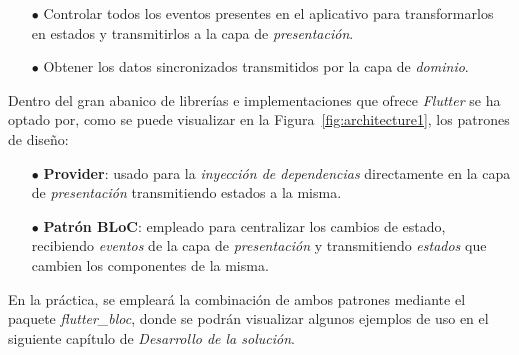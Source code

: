 \begin{itemize}
  \item[$\bullet$] Controlar todos los eventos presentes en el aplicativo 
  para transformarlos en estados y transmitirlos a la capa de \textit{presentación}.
  \item[$\bullet$] Obtener los datos sincronizados transmitidos por la capa de \textit{dominio}.
\end{itemize}

Dentro del gran abanico de librerías e implementaciones que ofrece \textit{Flutter} se ha optado por, como se puede 
visualizar en la Figura~\ref{fig:architecture1}, los 
patrones de diseño:

\begin{itemize}
  \item[$\bullet$] \textbf{Provider}: usado para la \textit{inyección de dependencias} directamente en la capa
  de \textit{presentación} transmitiendo estados a la misma. 
  \item[$\bullet$] \textbf{Patrón BLoC}: empleado para centralizar los cambios de estado, recibiendo \textit{eventos}
   de la capa de \textit{presentación} y transmitiendo \textit{estados} que cambien los componentes de la misma.
\end{itemize}

En la práctica, se empleará la combinación de ambos patrones mediante el paquete \textit{flutter\_bloc}, 
donde se podrán visualizar algunos ejemplos de uso en el siguiente capítulo de \textit{Desarrollo de la solución}.
